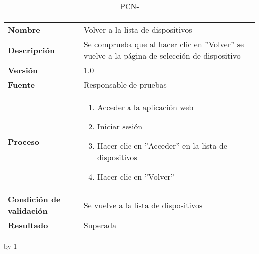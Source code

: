 \begin{table}[H]
	\caption{PCN-\number\pcn}
	\begin{tabular}{|l|p{}|}
		\hline
		\multicolumn{2}{|c|}{\cellcolor[HTML]{BFBFBF}{\color[HTML]{000000} \textbf{PCN-\number\pcn}}} \\ \hline
		\textbf{Nombre}                  & Volver a la lista de dispositivos                                                              \\ \hline
		\textbf{Descripción}             & Se comprueba que al hacer clic en ''Volver'' se vuelve a la página de selección de dispositivo \\ \hline
		\textbf{Versión}                 & 1.0                                                                                            \\ \hline
		\textbf{Fuente}                  & Responsable de pruebas                                                                         \\ \hline
		\textbf{Proceso}                 & \begin{enumerate}
			\item Acceder a la aplicación web
			\item Iniciar sesión
			\item Hacer clic en ''Acceder'' en la lista de dispositivos
			\item Hacer clic en ''Volver''
		\end{enumerate}                                                                     \\ \hline
		\textbf{Condición de validación} & Se vuelve a la lista de dispositivos                                                           \\ \hline
		\textbf{Resultado}               & Superada                                                                                       \\ \hline
	\end{tabular}
\end{table}
\advance\pcn by 1
